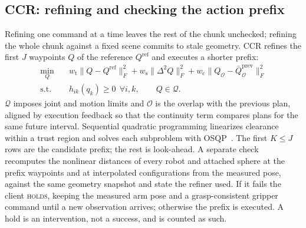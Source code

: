 \subsection{CCR: refining and checking the action prefix}
\label{sec:refine}
Refining one command at a time leaves the rest of the chunk unchecked; refining the whole chunk against a fixed scene commits to stale geometry. CCR refines the first $J$ waypoints $Q$ of the reference $Q^{\mathrm{ref}}$ and executes a shorter prefix:
\begin{equation}
\begin{split}
 \min_Q\quad &w_{\mathrm t}\|Q-Q^{\mathrm{ref}}\|_F^2
 +w_{\mathrm s}\|\Delta^2Q\|_F^2
 +w_{\mathrm c}\|Q_{\mathcal O}-\bar Q^{\mathrm{prev}}_{\mathcal O}\|_F^2\\
 \text{s.t.}\quad &h_{ik}(q_k)\geq0\ \ \forall i,k,\qquad Q\in\mathcal Q .
\end{split}
 \label{eq:qp}
\end{equation}
$\mathcal Q$ imposes joint and motion limits and $\mathcal O$ is the overlap with the previous plan, aligned by execution feedback so that the continuity term compares plans for the same future interval. Sequential quadratic programming linearizes clearance within a trust region and solves each subproblem with OSQP~\cite{stellato2020osqp}. The first $K\leq J$ rows are the candidate prefix; the rest is look-ahead. A separate check recomputes the nonlinear distances of every robot and attached sphere at the prefix waypoints and at interpolated configurations from the measured pose, against the same geometry snapshot and state the refiner used. If it fails the client \textsc{holds}, keeping the measured arm pose and a grasp-consistent gripper command until a new observation arrives; otherwise the prefix is executed. A hold is an intervention, not a success, and is counted as such.
